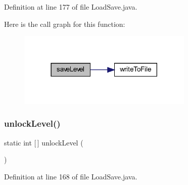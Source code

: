 Definition at line 177 of file Load\+Save.\+java.

Here is the call graph for this function\+:\nopagebreak
\begin{figure}[H]
\begin{center}
\leavevmode
\includegraphics[width=237pt]{classhelpz_1_1_load_save_a518631414c15c47704a28422e8fbdc33_cgraph}
\end{center}
\end{figure}
\mbox{\label{classhelpz_1_1_load_save_a1369888f20d8279b649d556082d38e72}} 
\subsubsection{\texorpdfstring{unlock\+Level()}{unlockLevel()}}
{\footnotesize\ttfamily static int \mbox{[}$\,$\mbox{]} unlock\+Level (\begin{DoxyParamCaption}{ }\end{DoxyParamCaption})\hspace{0.3cm}{\ttfamily [static]}}



Definition at line 168 of file Load\+Save.\+java.


